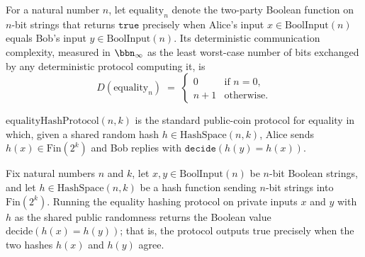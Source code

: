 \begin{theorem}
For a natural number $n$, let $\mathrm{equality}_n$ denote the two-party Boolean
function on $n$-bit strings that returns $\mathtt{true}$ precisely when Alice's input $x
\in \mathrm{BoolInput}(n)$ equals Bob's input $y \in \mathrm{BoolInput}(n)$. Its
deterministic communication complexity, measured in $\bbn_\infty$ as the least
worst-case number of bits exchanged by any deterministic protocol computing it, is
\[
  D(\mathrm{equality}_n) \;=\;
  \begin{cases}
    0 & \text{if } n = 0,\\
    n + 1 & \text{otherwise.}
  \end{cases}
\]
\end{theorem}

\begin{definition}
\label{CommunicationComplexity.Functions.Equality.equalityHashProtocol}
\leanok
{}
$\mathrm{equalityHashProtocol}(n, k)$ is the standard public-coin protocol for
equality in which, given a shared random hash $h \in \mathrm{HashSpace}(n, k)$,
Alice sends $h(x) \in \mathrm{Fin}(2^k)$ and Bob replies with
$\mathtt{decide}(h(y) = h(x))$.
\end{definition}

\begin{theorem}
\label{CommunicationComplexity.Functions.Equality.equalityHashProtocol_rrun}
\leanok
{}
Fix natural numbers $n$ and $k$, let $x, y \in \mathrm{BoolInput}(n)$ be $n$-bit Boolean
strings, and let $h \in \mathrm{HashSpace}(n,k)$ be a hash function sending $n$-bit
strings into $\mathrm{Fin}(2^k)$. Running the equality hashing protocol on private
inputs $x$ and $y$ with $h$ as the shared public randomness returns the Boolean value
$\mathrm{decide}(h(x) = h(y))$; that is, the protocol outputs $\mathrm{true}$ precisely
when the two hashes $h(x)$ and $h(y)$ agree.
\end{theorem}

